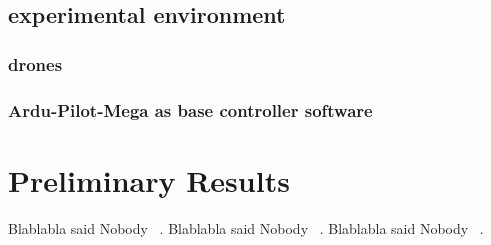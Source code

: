 \documentclass[11pt]{article}
\begin{document}
\subsection{experimental environment}
\subsubsection{drones}
\subsubsection{Ardu-Pilot-Mega as base controller software}

\section{Preliminary Results}
Blablabla said Nobody ~\cite{Merav}.
Blablabla said Nobody ~\cite{APM}.
Blablabla said Nobody ~\cite{RTComposer}.


{}

\end{document}
